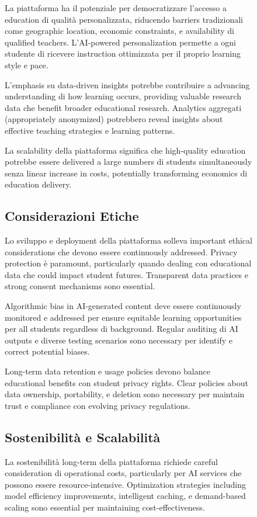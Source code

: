 \documentclass[12pt,a4paper]{article}
\begin{document}
\begin{figure}[H]
La piattaforma ha il potenziale per democratizzare l'accesso a education di qualità personalizzata, riducendo barriers tradizionali come geographic location, economic constraints, e availability di qualified teachers. L'AI-powered personalization permette a ogni studente di ricevere instruction ottimizzata per il proprio learning style e pace.

L'emphasis su data-driven insights potrebbe contribuire a advancing understanding di how learning occurs, providing valuable research data che benefit broader educational research. Analytics aggregati (appropriately anonymized) potrebbero reveal insights about effective teaching strategies e learning patterns.

La scalability della piattaforma significa che high-quality education potrebbe essere delivered a large numbers di students simultaneously senza linear increase in costs, potentially transforming economics di education delivery.

\subsection{Considerazioni Etiche}

Lo sviluppo e deployment della piattaforma solleva important ethical considerations che devono essere continuously addressed. Privacy protection è paramount, particularly quando dealing con educational data che could impact student futures. Transparent data practices e strong consent mechanisms sono essential.

Algorithmic bias in AI-generated content deve essere continuously monitored e addressed per ensure equitable learning opportunities per all students regardless di background. Regular auditing di AI outputs e diverse testing scenarios sono necessary per identify e correct potential biases.

Long-term data retention e usage policies devono balance educational benefits con student privacy rights. Clear policies about data ownership, portability, e deletion sono necessary per maintain trust e compliance con evolving privacy regulations.

\subsection{Sostenibilità e Scalabilità}

La sostenibilità long-term della piattaforma richiede careful consideration di operational costs, particularly per AI services che possono essere resource-intensive. Optimization strategies including model efficiency improvements, intelligent caching, e demand-based scaling sono essential per maintaining cost-effectiveness.


\end{figure}
\end{document}
